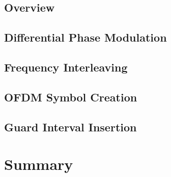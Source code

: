 \documentclass[class=report,11pt,crop=false]{standalone}
\begin{document}
\subsection{Overview}
\subsection{Differential Phase Modulation}
\blindmathpaper
\subsection{Frequency Interleaving}
\blindmathpaper
\subsection{OFDM Symbol Creation}
\blindmathpaper
\subsection{Guard Interval Insertion}
\blindmathpaper

\section{Summary}
\blindtext

\ifstandalone

\printnoidxglossary[type=\acronymtype]
\fi
\end{document}
